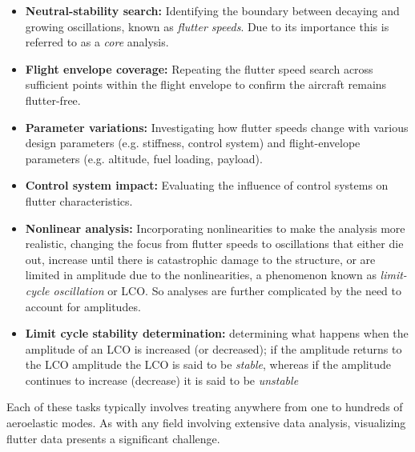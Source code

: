 \documentclass[10pt,openany,twoside]{book}
\numberwithin{equation}{section}   %
\newcommand{\Newterm}[1]{{\em #1}}
\begin{document}
\begin{itemize}\label{sect:tasks}
	\item {\bf Neutral-stability search:}
			 Identifying the boundary between decaying and growing
			oscillations, known as \Newterm{flutter speeds}. Due to its
			importance this is referred to as a \Newterm{core} analysis.
	\item {\bf Flight envelope coverage:} Repeating the flutter speed search across sufficient
	      points within the flight envelope to confirm the aircraft remains flutter-free.
	\item {\bf Parameter variations:} Investigating how flutter speeds change with various
	     design parameters (e.g. stiffness, control system) and flight-envelope
		  parameters (e.g. altitude, fuel loading, payload).
	\item {\bf Control system impact:} Evaluating the influence of control systems on
	      flutter characteristics.
	\item {\bf Nonlinear analysis:} Incorporating nonlinearities to make the analysis more
			realistic, changing the focus from flutter speeds
			to oscillations that either die out, increase until there is catastrophic
			damage to the structure, or are limited in amplitude due to the nonlinearities,
	     a phenomenon known as \Newterm{limit-cycle oscillation} or LCO.
		 	So analyses are further complicated by the need to account for amplitudes.
	\item {\bf Limit cycle stability determination:}
			determining what happens when the amplitude of an LCO is increased (or decreased);
			if the amplitude returns to the LCO amplitude the LCO is said to be \emph{stable},
			whereas if the amplitude continues to increase (decrease) it is said to be \emph{unstable}
\end{itemize}
Each of these tasks typically involves treating anywhere from one to hundreds
of aeroelastic modes.  As with any field involving extensive data analysis,
visualizing flutter data presents a significant challenge.
\end{document}
